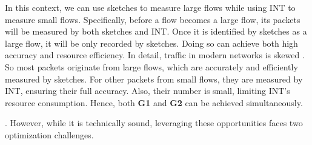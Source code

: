 
In this context, 
we can use sketches to measure large flows while using INT to measure small flows. 
Specifically, before a flow becomes a large flow, its packets will be measured by both sketches and INT. Once it is identified by sketches as a large flow, it will be only recorded by sketches. 
Doing so can achieve both high accuracy and resource efficiency. In detail, traffic in modern networks is skewed \cite{roy2015inside,huang2021toward,caida,benson2010network,yang2018elastic}. So most packets originate from large flows, which are accurately and efficiently measured by sketches. For other packets from small flows, they are measured by INT, ensuring their full accuracy. Also, their number is small, limiting INT's resource consumption. Hence, both \textbf{G1} and \textbf{G2} can be achieved simultaneously. 

.
However, while it is technically sound, leveraging these opportunities faces two optimization challenges.

